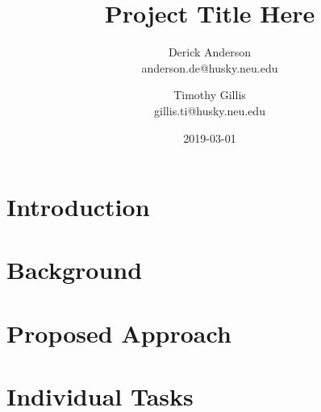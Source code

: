 \documentclass{article}
\title{Project Title Here}
\date{2019-03-01}
\author{Derick Anderson \\ anderson.de@husky.neu.edu
  \and Timothy Gillis \\ gillis.ti@husky.neu.edu }
\begin{document}
\maketitle

\section*{Introduction}

\section*{Background}

\section*{Proposed Approach}

\section*{Individual Tasks}

{}

\end{document}
